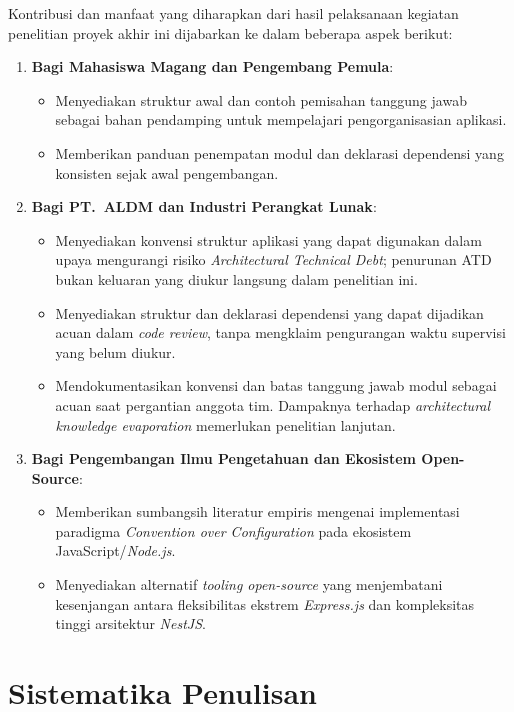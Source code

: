 \documentclass[12pt,a4paper,oneside]{report}
\begin{document}
Kontribusi dan manfaat yang diharapkan dari hasil pelaksanaan kegiatan penelitian proyek akhir ini dijabarkan ke dalam beberapa aspek berikut:
\begin{enumerate}
    \item \textbf{Bagi Mahasiswa Magang dan Pengembang Pemula}:
    \begin{itemize}
        \item Menyediakan struktur awal dan contoh pemisahan tanggung jawab sebagai bahan pendamping untuk mempelajari pengorganisasian aplikasi.
        \item Memberikan panduan penempatan modul dan deklarasi dependensi yang konsisten sejak awal pengembangan.
    \end{itemize}

    \item \textbf{Bagi PT.\ ALDM dan Industri Perangkat Lunak}:
    \begin{itemize}
        \item Menyediakan konvensi struktur aplikasi yang dapat digunakan dalam upaya mengurangi risiko \textit{Architectural Technical Debt}; penurunan ATD bukan keluaran yang diukur langsung dalam penelitian ini.
        \item Menyediakan struktur dan deklarasi dependensi yang dapat dijadikan acuan dalam \textit{code review}, tanpa mengklaim pengurangan waktu supervisi yang belum diukur.
        \item Mendokumentasikan konvensi dan batas tanggung jawab modul sebagai acuan saat pergantian anggota tim. Dampaknya terhadap \textit{architectural knowledge evaporation} memerlukan penelitian lanjutan.
    \end{itemize}

    \item \textbf{Bagi Pengembangan Ilmu Pengetahuan dan Ekosistem Open-Source}:
    \begin{itemize}
        \item Memberikan sumbangsih literatur empiris mengenai implementasi paradigma \textit{Convention over Configuration} pada ekosistem JavaScript/\allowbreak\textit{Node.js}.
        \item Menyediakan alternatif \textit{tooling open-source} yang menjembatani kesenjangan antara fleksibilitas ekstrem \textit{Express.js} dan kompleksitas tinggi arsitektur \textit{NestJS}.
    \end{itemize}
\end{enumerate}

\newpage
\section{Sistematika Penulisan}
\label{sec:sistematika_penulisan}
\end{document}
